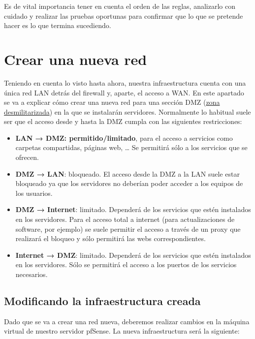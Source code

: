 Es de vital importancia tener en cuenta el orden de las reglas, analizarlo con cuidado y realizar las pruebas oportunas para confirmar que lo que se pretende hacer es lo que termina sucediendo.



\chapter{Crear una nueva red}
Teniendo en cuenta lo visto hasta ahora, nuestra infraestructura cuenta con una única red LAN detrás del firewall y, aparte, el acceso a WAN. En este apartado se va a explicar cómo crear una nueva red para una sección DMZ (\href{https://es.wikipedia.org/wiki/Zona_desmilitarizada_(inform%C3%A1tica)}{zona desmilitarizada}) en la que se instalarán servidores.
Normalmente lo habitual suele ser que el acceso desde y hasta la DMZ cumpla con las siguientes restricciones:

\begin{itemize}
    \item \textbf{LAN → DMZ: permitido/limitado}, para el acceso a servicios como carpetas compartidas, páginas web, … Se permitirá sólo a los servicios que se ofrecen.
    \item  \textbf{DMZ → LAN}: bloqueado. El acceso desde la DMZ a la LAN suele estar bloqueado ya que los servidores no deberían poder acceder a los equipos de los usuarios.
    \item \textbf{DMZ → Internet}: limitado. Dependerá de los servicios que estén instalados en los servidores. Para el acceso total a internet (para actualizaciones de software, por ejemplo) se suele permitir el acceso a través de un proxy que realizará el bloqueo y sólo permitirá las webs correspondientes.
    \item \textbf{Internet → DMZ}: limitado. Dependerá de los servicios que estén instalados en los servidores. Sólo se permitirá el acceso a los puertos de los servicios necesarios.
\end{itemize}

\section{Modificando la infraestructura creada}
Dado que se va a crear una red nueva, deberemos realizar cambios en la máquina virtual de nuestro servidor pfSense. La nueva infraestructura será la siguiente:

